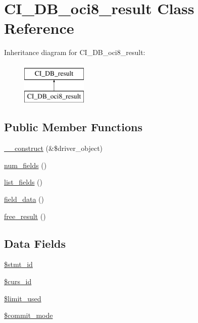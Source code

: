 \hypertarget{class_c_i___d_b__oci8__result}{}\section{C\+I\+\_\+\+D\+B\+\_\+oci8\+\_\+result Class Reference}
\label{class_c_i___d_b__oci8__result}
Inheritance diagram for C\+I\+\_\+\+D\+B\+\_\+oci8\+\_\+result\+:\begin{figure}[H]
\begin{center}
\leavevmode
\includegraphics[height=2.000000cm]{class_c_i___d_b__oci8__result}
\end{center}
\end{figure}
\subsection*{Public Member Functions}
\begin{DoxyCompactItemize}
\item 
\hyperlink{class_c_i___d_b__oci8__result_a8e093c8b6e5733bc3f306385ee426ab7}{\+\_\+\+\_\+construct} (\&\$driver\+\_\+object)
\item 
\hyperlink{class_c_i___d_b__oci8__result_af831bf363e4d7d661a717a4932af449d}{num\+\_\+fields} ()
\item 
\hyperlink{class_c_i___d_b__oci8__result_a50b54eb4ea7cfd039740f532988ea776}{list\+\_\+fields} ()
\item 
\hyperlink{class_c_i___d_b__oci8__result_a84bffd65e53902ade1591716749a33e3}{field\+\_\+data} ()
\item 
\hyperlink{class_c_i___d_b__oci8__result_aad2d98d6beb3d6095405356c6107b473}{free\+\_\+result} ()
\end{DoxyCompactItemize}
\subsection*{Data Fields}
\begin{DoxyCompactItemize}
\item 
\hyperlink{class_c_i___d_b__oci8__result_a1a97f17fd259cd27c73b65e6c3706ec0}{\$stmt\+\_\+id}
\item 
\hyperlink{class_c_i___d_b__oci8__result_a75e7d18ad2e68ace3813533c9da2e179}{\$curs\+\_\+id}
\item 
\hyperlink{class_c_i___d_b__oci8__result_a96df35d7e3e76bef21ebb80234fe59e8}{\$limit\+\_\+used}
\item 
\hyperlink{class_c_i___d_b__oci8__result_a9b3b7163763603c5a0bcdfd819ae074d}{\$commit\+\_\+mode}
\end{DoxyCompactItemize}
